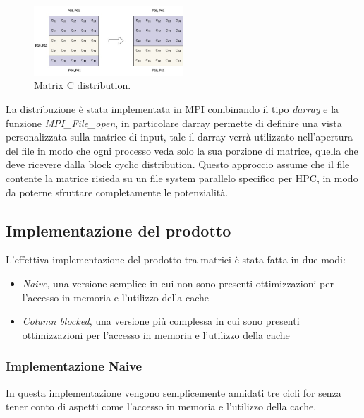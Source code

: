 \documentclass[conference]{IEEEtran}
\begin{document}
\begin{figure}
    \centering
    \includegraphics[width=0.5\textwidth]{resources/matrixC_row_block_cyclic_distribution.jpg}
    \caption{Matrix C distribution.}
    \label{fig:matrix_c_distribution}
\end{figure}
La distribuzione è stata implementata in MPI combinando il tipo \textit{darray} e la funzione \textit{MPI\_File\_open}, in particolare darray permette di definire una vista personalizzata sulla matrice di input, tale il darray verrà utilizzato nell'apertura del file in modo che ogni processo veda solo la sua porzione di matrice, quella che deve ricevere dalla block cyclic distribution. Questo approccio assume che il file contente la matrice risieda su un file system parallelo specifico per HPC, in modo da poterne sfruttare completamente le potenzialità.
\subsection{Implementazione del prodotto}
L'effettiva implementazione del prodotto tra matrici è stata fatta in due modi:
\begin{itemize}
    \item \textit{Naive}, una versione semplice in cui non sono presenti ottimizzazioni per l'accesso in memoria e l'utilizzo della cache
    \item \textit{Column blocked}, una versione più complessa in cui sono presenti ottimizzazioni per l'accesso in memoria e l'utilizzo della cache
\end{itemize}
\subsubsection{Implementazione Naive}
In questa implementazione vengono semplicemente annidati tre cicli for senza tener conto di aspetti come l'accesso in memoria e l'utilizzo della cache.
\end{document}
